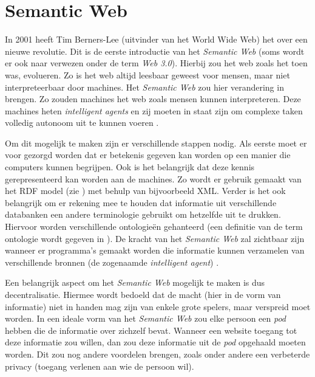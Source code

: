 \section{Semantic Web}
\label{sec:semantic_web}
In 2001 heeft Tim Berners-Lee (uitvinder van het World Wide Web) het over een nieuwe revolutie. Dit is de eerste introductie van het \textit{Semantic Web} (soms wordt er ook naar verwezen onder de term \textit{Web 3.0}). Hierbij zou het web zoals het toen was, evolueren. Zo is het web altijd leesbaar geweest voor mensen, maar niet interpreteerbaar door machines. Het \textit{Semantic Web} zou hier verandering in brengen. Zo zouden machines het web zoals mensen kunnen interpreteren. Deze machines heten \textit{intelligent agents} en zij moeten in staat zijn om complexe taken volledig autonoom uit te kunnen voeren \cite{berners2001semantic}.

Om dit mogelijk te maken zijn er verschillende stappen nodig. Als eerste moet er voor gezorgd worden dat er betekenis gegeven kan worden op een manier die computers kunnen begrijpen. Ook is het belangrijk dat deze kennis gerepresenteerd kan worden aan de machines. Zo wordt er gebruik gemaakt van het RDF model (zie ) met behulp van bijvoorbeeld XML. Verder is het ook belangrijk om er rekening mee te houden dat informatie uit verschillende databanken een andere terminologie gebruikt om hetzelfde uit te drukken. Hiervoor worden verschillende ontologieën gehanteerd (een definitie van de term ontologie wordt gegeven in ). De kracht van het \textit{Semantic Web} zal zichtbaar zijn wanneer er programma's gemaakt worden die informatie kunnen verzamelen van verschillende bronnen (de zogenaamde \textit{intelligent agent}) \cite{berners2001semantic}.

Een belangrijk aspect om het \textit{Semantic Web} mogelijk te maken is dus decentralisatie. Hiermee wordt bedoeld dat de macht (hier in de vorm van informatie) niet in handen mag zijn van enkele grote spelers, maar verspreid moet worden. In een ideale vorm van het \textit{Semantic Web} zou elke persoon een \textit{pod} hebben die de informatie over zichzelf bevat. Wanneer een website toegang tot deze informatie zou willen, dan zou deze informatie uit de \textit{pod} opgehaald moeten worden. Dit zou nog andere voordelen brengen, zoals onder andere een verbeterde privacy (toegang verlenen aan wie de persoon wil).

